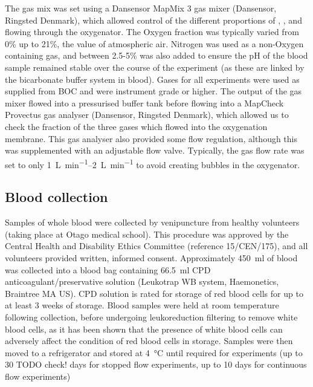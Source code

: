 The gas mix was set using a Dansensor MapMix 3 gas mixer (Dansensor, Ringsted Denmark), which allowed control of the different proportions of \Ntwo, \Otwo, and \COtwo flowing through the oxygenator.
The Oxygen fraction was typically varied from 0\% up to 21\%, the value of atmospheric air.
Nitrogen was used as a non-Oxygen containing gas, and between 2.5-5\% \COtwo was also added to ensure the pH of the blood sample remained stable over the course of the experiment (as these are linked by the bicarbonate buffer system in blood).
Gases for all experiments were used as supplied from BOC and were instrument grade or higher.
The output of the gas mixer flowed into a pressurised buffer tank before flowing into a MapCheck Provectus gas analyser (Dansensor, Ringsted Denmark), which allowed us to check the fraction of the three gases which flowed into the oxygenation membrane.
This gas analyser also provided some flow regulation, although this was supplemented with an adjustable flow valve.
Typically, the gas flow rate was set to only \SIrange[per-mode=symbol]{1}{2}{\liter\per\minute} to avoid creating bubbles in the oxygenator.

\subsection{Blood collection}
Samples of whole blood were collected by venipuncture from healthy volunteers (taking place at Otago medical school).
This procedure was approved by the Central Health and Disability Ethics Committee (reference 15/CEN/175), and all volunteers provided written, informed consent.
Approximately \SI{450}{ml} of blood was collected into a blood bag containing \SI{66.5}{\milli\litre} CPD anticoagulant/preservative solution (Leukotrap WB system, Haemonetics, Braintree MA US).
CPD solution is rated for storage of red blood cells for up to at least 3 weeks of storage\cite{Hessupdatesolutionsred2006}.
Blood samples were held at room temperature following collection, before undergoing leukoreduction filtering to remove white blood cells, as it has been shown that the presence of white blood cells can adversely affect the condition of red blood cells in storage\cite{Hessupdatesolutionsred2006}.
Samples were then moved to a refrigerator and stored at \SI{4}{\degreeCelsius} until required for experiments (up to 30 TODO check! days for stopped flow experiments, up to 10 days for continuous flow experiments)

